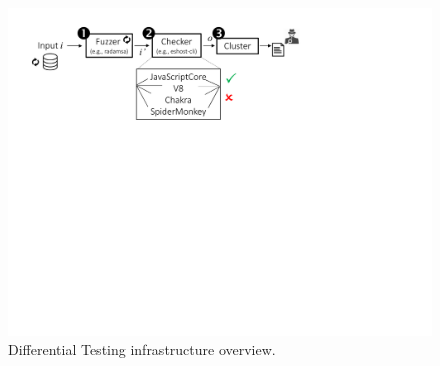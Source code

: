 \documentclass[smallextended]{svjour3}
\begin{document}







\begin{figure}[t]
  \centering
  \includegraphics[trim=0 350 0 0,clip,width=1.0\textwidth]{diff-testing-runtimes}
  \vspace{-5ex}
  \caption{\label{fig:workflow}Differential Testing infrastructure overview.}
  \vspace{-2ex}
\end{figure}
\end{document}
